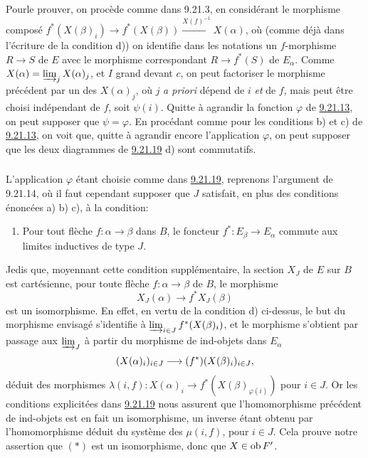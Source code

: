 \documentclass[10pt]{../fichiers-configuration-latex/smfart}
\def\labelenumi{(\theenumi)}
\begin{document}
Pour\pageoriginale le prouver, on procède comme dans 9.21.3, en
considérant le morphisme composé $f^\ast(X(\beta)_i)\rightarrow
f^\ast(X(\beta))\xrightarrow{X(f)^{-1}}X(\alpha)$, où (comme déjà
dans l'écriture de la condition d)) on identifie dans les notations
un $f$-morphisme $R\rightarrow S$ de $E$ avec le morphisme
correspondant $R\rightarrow f^\ast(S)$ de $E_{\alpha}$. Comme
$X(\alpha)=\varinjlim_j X(\alpha)_j$, et $I$ grand devant $c$, on
peut factoriser le morphisme précédent par un des $X(\alpha)_j$, où
$j$ \textit{a priori} dépend de $i$ \emph{et} de $f$, mais peut être
choisi indépendant de $f$, soit $\psi(i)$. Quitte à agrandir la
fonction $\varphi$ de \hyperref[I.lem9.21.13]{9.21.13}, on peut supposer que $\psi=\varphi$.
En procédant comme pour les conditions b) et c) de
\hyperref[I.lem9.21.13]{9.21.13}, on voit
que, quitte à agrandir encore l'application $\varphi$, on peut
supposer que les deux diagrammes de \hyperref[I.lem9.21.19]{9.21.19} d) sont commutatifs.

\setcounter{subsection}{21} \setcounter{subsubsection}{19}
\subsubsection{}
L'application $\varphi$ étant choisie comme dans
\hyperref[I.lem9.21.19]{9.21.19}, reprenons
l'argument de 9.21.14, où il faut cependant supposer que $J$
satisfait, en plus des conditions énoncées a) b) c), à la condition:
\begin{enumerate}
\renewcommand{\theenumi}{\alph{enumi}}
\renewcommand{\labelenumi}{\theenumi)}
\setcounter{enumi}{3}
\item Pour tout flèche $f:\alpha\rightarrow \beta$ dans $B$, le
foncteur $f^\ast:E_{\beta}\rightarrow E_{\alpha}$ commute aux
limites inductives de type $J$.
\end{enumerate}

Je\pageoriginale dis que, moyennant cette condition supplémentaire,
la section $X_J$ de $E$ sur $B$ est cartésienne, \ie pour toute
flèche $f:\alpha\rightarrow \beta$ de $B$, le morphisme
\begin{equation}
X_J(\alpha)\longrightarrow f^\ast X_J(\beta)\tag{$\ast$}
\end{equation}
est un isomorphisme. En effet, en vertu de la condition d)
ci-dessus, le but du morphisme envisagé s'identifie à
$\varinjlim_{i\in J}f^\ast(X(\beta)_i)$, et le morphisme s'obtient
par passage aux $\varinjlim_J$ à partir du morphisme de ind-objets
dans $E_{\alpha}$
$$
(X(\alpha)_i)_{i\in J}\longrightarrow (f^\ast)(X(\beta)_i)_{i\in
J}{},
$$
déduit des morphismes $\lambda(i,f):X(\alpha)_i\rightarrow
f^\ast(X(\beta)_{\varphi(i)})$ pour $i\in J$. Or les conditions
explicitées dans \hyperref[I.lem9.21.19]{9.21.19} nous assurent que
l'homomorphisme précédent
de ind-objets est en fait un isomorphisme, un inverse étant obtenu
par l'homomorphisme déduit du système des $\mu(i,f)$, pour $i\in J$.
Cela prouve notre assertion que $(\ast)$ est un %
isomorphisme, donc que $X\in \operatorname{ob} F'$.
\end{document}
